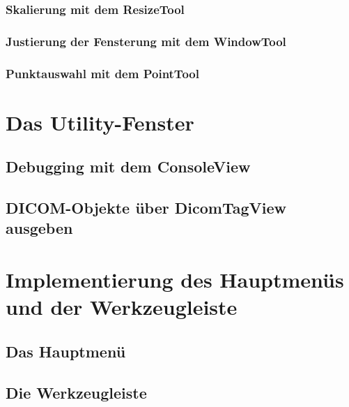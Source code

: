 \subsubsection{Skalierung mit dem ResizeTool}

\subsubsection{Justierung der Fensterung mit dem WindowTool}

\subsubsection{Punktauswahl mit dem PointTool}

\section{Das Utility-Fenster}

\subsection{Debugging mit dem ConsoleView}

\subsection{DICOM-Objekte über DicomTagView ausgeben}

\section{Implementierung des Hauptmenüs und der Werkzeugleiste}

\subsection{Das Hauptmenü}

\subsection{Die Werkzeugleiste}



